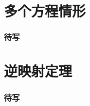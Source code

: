 \section{多个方程情形}


\begin{frame}
\frametitle{待写}

\end{frame}


\section{逆映射定理}


\begin{frame}
\frametitle{待写}

\end{frame}



